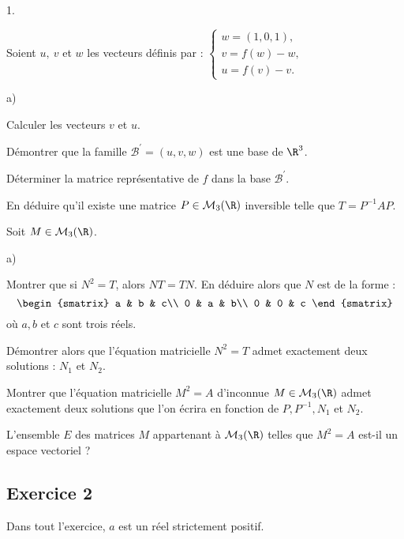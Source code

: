 \documentclass[11pt]{article}%
\begin{document}
{\begin{noliste}{1.}
 \setlength{\itemsep}{4mm}
	\item Soient $u,~ v$ et $w$ les vecteurs définis par : $\left\{
\begin{array}{l}
 w = (1,0,1),\\
v = f(w)-w,\\
u = f(v)-v.
\end{array}
\right.$
	\begin{noliste}{a)}
 \setlength{\itemsep}{2mm}
		\item Calculer les vecteurs $v$ et $u$.
		\item Démontrer que la famille $\mathcal B^\prime = (u,v,w)$ est une
base de $\R^{3}$.
		\item Déterminer la matrice représentative de $f$ dans la base
$\mathcal B^\prime$.
		\item En déduire qu'il existe une matrice $P\in\mathcal M_{3}(\R)$
inversible telle que $T = P^{-1}AP$.
	\end{noliste}
	\item Soit $M\in\mathcal M_{3}(\R)$.
	\begin{noliste}{a)}
 \setlength{\itemsep}{2mm}
		\item Montrer que si $N^{2} = T$, alors $NT = TN$. En déduire alors
que $N$ est de la forme :
			\[
\begin{smatrix}
a & b & c\\
0 & a & b\\
0 & 0 & c
\end{smatrix}
\]
			où $a, b$ et $c$ sont trois réels.
		\item Démontrer alors que l'équation matricielle $N^{2} = T$ admet
exactement deux solutions : $N_{1}$ et $N_{2}$.
	\end{noliste}
	\item Montrer que l'équation matricielle $M^{2} = A$ d'inconnue
$M\in\mathcal M_{3}(\R)$ admet exactement deux solutions que l'on
écrira en fonction de $P, P^{-1}, N_{1}$ et $N_{2}$.
	\item L'ensemble $E$ des matrices $M$ appartenant à $\mathcal
M_{3}(\R)$ telles que $M^{2} = A$ est-il un espace vectoriel ?
\end{noliste}



\subsection*{Exercice 2}

Dans tout l'exercice, $a$ est un réel strictement positif.

}
\end{document}
